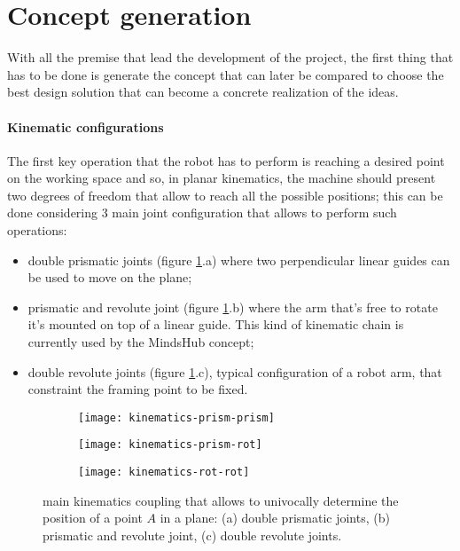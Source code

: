 \section{Concept generation}
	With all the premise that lead the development of the project, the first thing that has to be done is generate the concept that can later be compared to choose the best design solution that can become a concrete realization of the ideas.
	
	\paragraph{Kinematic configurations} The first key operation that the robot has to perform is reaching a desired point on the working space and so, in planar kinematics, the machine should present two degrees of freedom that allow to reach all the possible positions; this can be done considering 3 main joint configuration that allows to perform such operations:
	\begin{itemize}
		\item double prismatic joints (figure \ref{fig:kinematiccoupling}.a) where two perpendicular linear guides can be used to move on the plane;
		\item prismatic and revolute joint (figure \ref{fig:kinematiccoupling}.b) where the arm that's free to rotate it's mounted on top of a linear guide. This kind of kinematic chain is currently used by the MindsHub concept;
		\item double revolute joints (figure \ref{fig:kinematiccoupling}.c), typical configuration of a robot arm, that constraint the framing point to be fixed.
	\end{itemize}
	
	\begin{figure}[bht]
	\centering
		\begin{subfigure}{0.32\linewidth}
			\centering \texttt{[image: kinematics-prism-prism]}
			\caption{}
		\end{subfigure}
		\begin{subfigure}{0.32\linewidth}
			\centering \texttt{[image: kinematics-prism-rot]}
			\caption{}
		\end{subfigure}
		\begin{subfigure}{0.32\linewidth}
			\centering \texttt{[image: kinematics-rot-rot]}
			\caption{}
		\end{subfigure}
		\caption{main kinematics coupling that allows to univocally determine the position of a point $A$ in a plane: (a) double prismatic joints, (b) prismatic and revolute joint, (c) double revolute joints.}
		\label{fig:kinematiccoupling}
	\end{figure}
	
